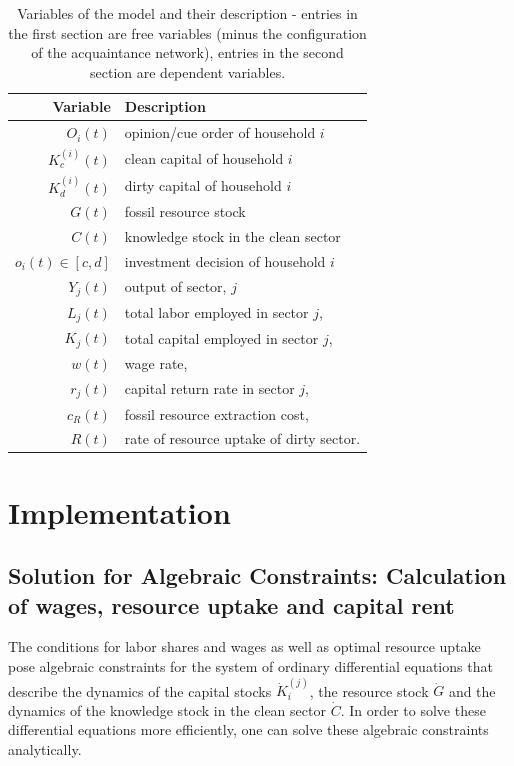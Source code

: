 \begin{table}[t]
	\centering
	\begin{tabular}{r|l}
		Variable & Description \\\hline
		$O_i(t)$ & opinion/cue order of household $i$ \\
		$K^{(i)}_c(t)$ & clean capital of household $i$ \\
		$K^{(i)}_d(t)$ & dirty capital of household $i$ \\
		$G(t)$ & fossil resource stock \\
                $C(t)$ & knowledge stock in the clean sector \\\hline
		$o_i(t) \in [c,d]$ & investment decision of household $i$ \\
		$Y_j(t)$ & output of sector, $j$ \\
		$L_j(t)$ & total labor employed in sector $j$, \\
		$K_j(t)$ & total capital employed in sector $j$, \\
		$w(t)$   & wage rate, \\
		$r_j(t)$ & capital return rate in sector $j$, \\
		$c_R(t)$ & fossil resource extraction cost, \\
		$R(t)$ & rate of resource uptake of dirty sector. \\
	\end{tabular}
        \caption{Variables of the model and their description - entries in the first section are free variables (minus the configuration of the acquaintance network), entries in the second section are dependent variables.}
	\label{tab:derived_variables}
 \end{table}

 
  \section{Implementation} 



\subsection{Solution for Algebraic Constraints: Calculation of wages, resource uptake and capital rent}
\label{sec:algebraic_constraints}

The conditions for labor shares and wages as well as optimal resource uptake pose algebraic constraints for the system of ordinary differential equations that describe the dynamics of the capital stocks $\dot{K}_i^{(j)}$, the resource stock $\dot{G}$ and the dynamics of the knowledge stock in the clean sector $\dot{C}$. In order to solve these differential equations more efficiently, one can solve these algebraic constraints analytically.


